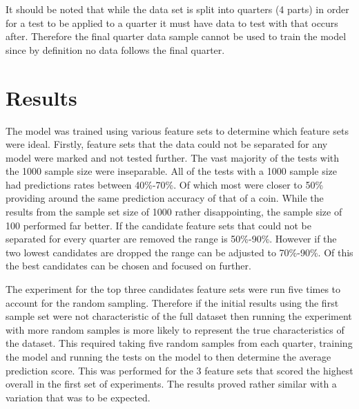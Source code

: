 
It should be noted that while the data set is split into quarters (4 parts) in order for a test to be applied to a quarter it must have data to test with that occurs after. Therefore the final quarter data sample cannot be used to train the model since by definition no data follows the final quarter.

\section{Results}

The model was trained using various feature sets to determine which feature sets were ideal. Firstly, feature sets that the data could not be separated for any model were marked and not tested further. The vast majority of the tests with the 1000 sample size were inseparable.
All of the tests with a 1000 sample size had predictions rates between 40\%-70\%. Of which most were closer to 50\% providing around the same prediction accuracy of that of a coin.
While the results from the sample set size of 1000 rather disappointing, the sample size of 100 performed far better. If the candidate feature sets that could not be separated for every quarter are removed the range is 50\%-90\%. However if the two lowest candidates are dropped the range can be adjusted to 70\%-90\%. Of this the best candidates can be chosen and focused on further.

The experiment for the top three candidates feature sets were run five times to account for the random sampling. Therefore if the initial results using the first sample set were not characteristic of the full dataset then running the experiment with more random samples is more likely to represent the true characteristics of the dataset. This required taking five random samples from each quarter, training the model and running the tests on the model to then determine the average prediction score. This was performed for the 3 feature sets that scored the highest overall in the first set of experiments. The results proved rather similar with a variation that was to be expected.



